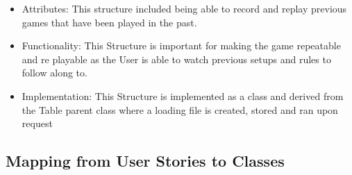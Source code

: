 \documentclass[a4paper]{project}
\begin{document}
			\begin{itemize}
				\item Attributes: This structure included being able to record and replay previous games that have been played in the past.
				\item Functionality: This Structure is important for making the game repeatable and re playable as the User is able to watch previous setups and rules to follow along to.
				\item Implementation: This Structure is implemented as a class and derived from the Table parent class where a loading file is created, stored and ran upon request
			\end{itemize}
		
		\subsection{Mapping from User Stories to Classes}\label{subsec:mapping-from-user-stories-to-classes}
		
\end{document}
